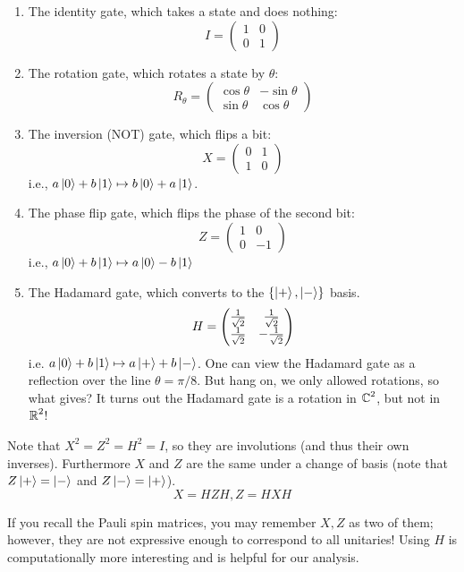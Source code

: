 \begin{definition}
    \begin{enumerate}
        \item The identity gate, which takes a state and does nothing:
        \[ I = \begin{pmatrix}
           1 & 0 \\ 0 & 1 
        \end{pmatrix} \]
        \item The rotation gate, which rotates a state by $\theta$:
        \[ R_{\theta} = \begin{pmatrix} \cos\theta & -\sin\theta \\ \sin\theta & \cos\theta \end{pmatrix}\]
        \item The inversion (NOT) gate, which flips a bit:
        \[ X = \begin{pmatrix}
            0 & 1 \\ 1 & 0
        \end{pmatrix} \]
        i.e., $a \ket{0} + b \ket{1} \mapsto b \ket{0} + a \ket{1}$.
        \item The phase flip gate, which flips the phase of the second bit:
        \[ Z = \begin{pmatrix}
            1 & 0 \\ 0 & -1
        \end{pmatrix} \]
        i.e., $a \ket{0} + b \ket{1} \mapsto a \ket{0} - b\ket{1}$
        \item The Hadamard gate, which converts to the $\{\ket{+}, \ket{-}\}$ basis.
        \[ H = \begin{pmatrix}
            \frac{1}{\sqrt{2}} & \frac{1}{\sqrt{2}} \\ \frac{1}{\sqrt{2}} & -\frac{1}{\sqrt{2}}
        \end{pmatrix} \]
        i.e. $a \ket{0} + b \ket{1} \mapsto a \ket{+} + b \ket{-}$.
        One can view the Hadamard gate as a reflection over the line $\theta = \pi/8$. But hang on, we only allowed rotations, so what gives?
        It turns out the Hadamard gate is a rotation in $\operatorname{\mathbb{C}}^2$, but not in $\operatorname{\mathbb{R}}^2$!
    \end{enumerate}
    Note that $X^2 = Z^2 = H^2 = I$, so they are involutions (and thus their own inverses). Furthermore $X$ and $Z$ are the same under a change of basis (note that $Z\ket{+} = \ket{-}$ and $Z \ket{-} = \ket{+}$).
    \[ X = HZH, Z = HXH \]
\end{definition}

If you recall the Pauli spin matrices, you may remember $X, Z$ as two of them; however, they are not expressive enough to correspond to all unitaries!
Using $H$ is computationally more interesting and is helpful for our analysis.

